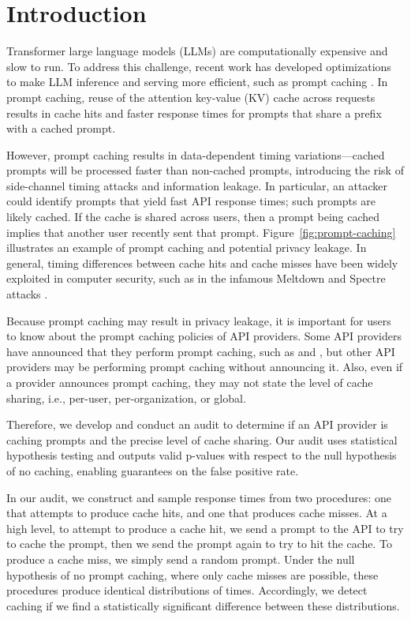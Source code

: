 \section{Introduction}



Transformer large language models (LLMs) are computationally expensive and slow to run. To address this challenge, recent work has developed optimizations to make LLM inference and serving more efficient, such as prompt caching \citep{zheng2024sglang,gim2024prompt}. In prompt caching, reuse of the attention key-value (KV) cache across requests results in cache hits and faster response times for prompts that share a prefix with a cached prompt.


However, prompt caching results in data-dependent timing variations---cached prompts will be processed faster than non-cached prompts, introducing the risk of side-channel timing attacks and information leakage. In particular, an attacker could identify prompts that yield fast API response times; such prompts are likely cached. If the cache is shared across users, then a prompt being cached implies that another user recently sent that prompt. Figure~\ref{fig:prompt-caching} illustrates an example of prompt caching and potential privacy leakage. In general, timing differences between cache hits and cache misses have been widely exploited in computer security, such as in the infamous Meltdown \citep{lipp2018meltdown} and Spectre attacks \citep{kocher2018spectre}.



Because prompt caching may result in privacy leakage, it is important for users to know about the prompt caching policies of API providers. Some API providers have announced that they perform prompt caching, such as \citet{anthropic-caching-news} and \citet{openai-caching-news}, but other API providers may be performing prompt caching without announcing it. Also, even if a provider announces prompt caching, they may not state the level of cache sharing, i.e., per-user, per-organization, or global.


Therefore, we develop and conduct an audit to determine if an API provider is caching prompts and the precise level of cache sharing. Our audit uses statistical hypothesis testing and outputs valid p-values with respect to the null hypothesis of no caching, enabling guarantees on the false positive rate.

In our audit, we construct and sample response times from two procedures: one that attempts to produce cache hits, and one that produces cache misses. At a high level, to attempt to produce a cache hit, we send a prompt to the API to try to cache the prompt, then we send the prompt again to try to hit the cache. To produce a cache miss, we simply send a random prompt. Under the null hypothesis of no prompt caching, where only cache misses are possible, these procedures produce identical distributions of times. Accordingly, we detect caching if we find a statistically significant difference between these distributions.



